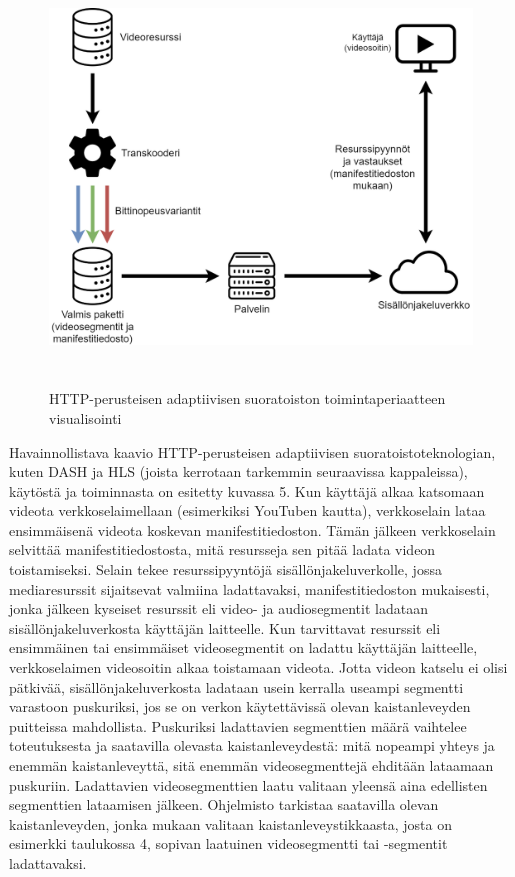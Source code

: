 \documentclass[finnish, 12pt, a4paper, elec, utf8, a-1b, online]{aaltothesis}
\begin{document}
\begin{figure}[htb]
  \centering
  \includegraphics[height=11cm]{./img/abr-streaming.png}
  \caption{HTTP-perusteisen adaptiivisen suoratoiston toimintaperiaatteen visualisointi \label{kuva5}}
\end{figure}

\noindent Havainnollistava kaavio HTTP-perusteisen adaptiivisen suoratoistoteknologian, kuten DASH ja HLS (joista kerrotaan tarkemmin seuraavissa kappaleissa), käytöstä ja toiminnasta on esitetty kuvassa 5. Kun käyttäjä alkaa katsomaan videota verkkoselaimellaan (esimerkiksi YouTuben kautta), verkkoselain lataa ensimmäisenä videota koskevan manifestitiedoston. Tämän jälkeen verkkoselain selvittää manifestitiedostosta, mitä resursseja sen pitää ladata videon toistamiseksi. Selain tekee resurssipyyntöjä sisällönjakeluverkolle, jossa mediaresurssit sijaitsevat valmiina ladattavaksi, manifestitiedoston mukaisesti, jonka jälkeen kyseiset resurssit eli video- ja audiosegmentit ladataan sisällönjakeluverkosta käyttäjän laitteelle. Kun tarvittavat resurssit eli ensimmäinen tai ensimmäiset videosegmentit on ladattu käyttäjän laitteelle, verkkoselaimen videosoitin alkaa toistamaan videota. Jotta videon katselu ei olisi pätkivää, sisällönjakeluverkosta ladataan usein kerralla useampi segmentti varastoon puskuriksi, jos se on verkon käytettävissä olevan kaistanleveyden puitteissa mahdollista. Puskuriksi ladattavien segmenttien määrä vaihtelee toteutuksesta ja saatavilla olevasta kaistanleveydestä: mitä nopeampi yhteys ja enemmän kaistanleveyttä, sitä enemmän videosegmenttejä ehditään lataamaan puskuriin. Ladattavien videosegmenttien laatu valitaan yleensä aina edellisten segmenttien lataamisen jälkeen. Ohjelmisto tarkistaa saatavilla olevan kaistanleveyden, jonka mukaan valitaan kaistanleveystikkaasta, josta on esimerkki taulukossa 4, sopivan laatuinen videosegmentti tai -segmentit ladattavaksi. \cite{Ottverse} \\
\end{document}
